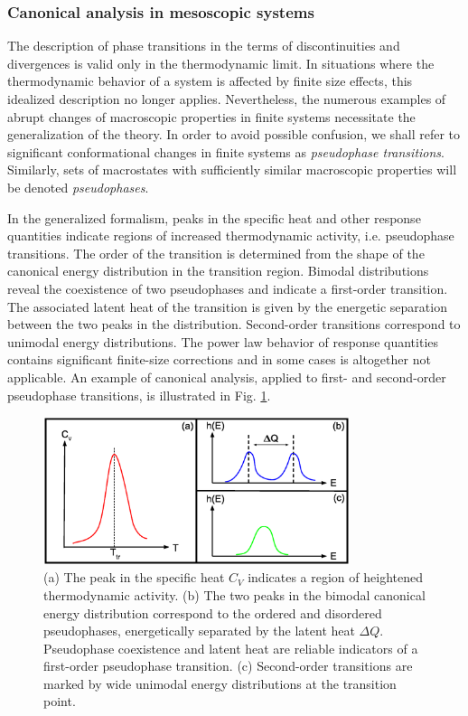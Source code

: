 \documentclass[12pt]{report}
\begin{document}
\subsubsection{Canonical analysis in mesoscopic systems} 
The description of phase transitions in the terms of discontinuities and divergences is valid only in the thermodynamic limit. In situations where the thermodynamic behavior of a system is affected by finite size effects, this idealized description no longer applies. Nevertheless, the numerous examples of abrupt changes of macroscopic properties in finite systems necessitate the generalization of the theory. In order to avoid possible confusion, we shall refer to significant conformational changes in finite systems as \textit{pseudophase transitions}. Similarly, sets of macrostates with sufficiently similar macroscopic properties will be denoted \textit{pseudophases}.

In the generalized formalism, peaks in the specific heat and other response quantities indicate regions of increased thermodynamic activity, i.e. pseudophase transitions. The order of the transition is determined from the shape of the canonical energy distribution in the transition region. Bimodal distributions reveal the coexistence of two pseudophases and indicate a first-order transition\cite{Janke1998}. The associated latent heat of the transition is given by the energetic separation between the two peaks in the distribution. Second-order transitions correspond to unimodal energy distributions. The power law behavior of response quantities contains significant finite-size corrections and in some cases is altogether not applicable\cite{Landau2000}. An example of canonical analysis, applied to first- and second-order pseudophase transitions, is illustrated in Fig. \ref{fig:Fig_5}. 

\begin{figure}
\center
\includegraphics[width = 0.8\textwidth]{chapter2Figs/CanonicalAnalysisSample.eps}
\caption{\label{fig:Fig_5}%
(a) The peak in the specific heat $C_{V}$ indicates a region of heightened thermodynamic activity. (b) The two peaks in the bimodal canonical energy distribution correspond to the ordered and disordered pseudophases, energetically separated by the latent heat $\Delta Q$. Pseudophase coexistence and latent heat are reliable indicators of a first-order pseudophase transition. (c) Second-order transitions are marked by wide unimodal energy distributions at the transition point.}
\end{figure}
\end{document}
